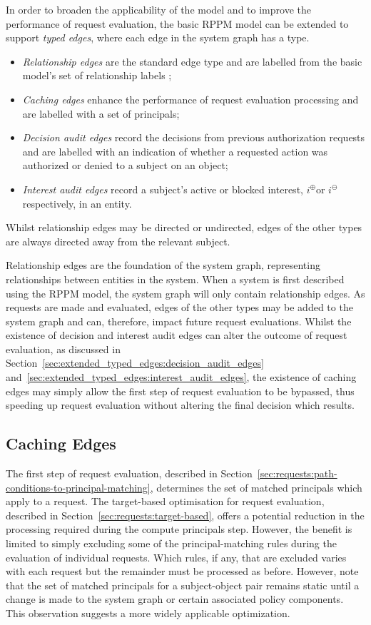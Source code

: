 \documentclass{article}
\newcommand{\interesta}{\ensuremath{i^\oplus}}
\newcommand{\interestb}{\ensuremath{i^\ominus}}
\begin{document}
In order to broaden the applicability of the model and to improve the performance of request evaluation, the basic RPPM model can be extended to support \emph{typed edges}, where each edge in the system graph has a type.
\begin{itemize}
    \item \emph{Relationship edges} are the standard edge type and are labelled from the basic model's set of relationship labels ;
    \item \emph{Caching edges} enhance the performance of request evaluation processing and are labelled with a set of principals;
    \item \emph{Decision audit edges} record the decisions from previous authorization requests and are labelled with an indication of whether a requested action  was authorized  or denied  to a subject on an object;
    \item \emph{Interest audit edges} record a subject's active or blocked interest, \interesta  or \interestb respectively, in an entity.
\end{itemize}
Whilst relationship edges may be directed or undirected,  edges of the other types are always directed away from the relevant subject.

Relationship edges are the foundation of the system graph, representing relationships between entities in the system.
When a system is first described using the RPPM model, the system graph will only contain relationship edges.
As requests are made and evaluated, edges of the other types may be added to the system graph and can, therefore, impact future request evaluations.
Whilst the existence of decision and interest audit edges can alter the outcome of request evaluation, as discussed in Section~\ref{sec:extended_typed_edges:decision_audit_edges} and~\ref{sec:extended_typed_edges:interest_audit_edges}, the existence of caching edges may simply allow the first step of request evaluation to be bypassed, thus speeding up request evaluation without altering the final decision which results.

\subsection{Caching Edges}\label{sec:extended_typed_edges:caching_edges}
The first step of request evaluation, described in Section~\ref{sec:requests:path-conditions-to-principal-matching}, determines the set of matched principals which apply to a request.
The target-based optimisation for request evaluation, described in Section~\ref{sec:requests:target-based}, offers a potential reduction in the processing required during the compute principals step.
However, the benefit is limited to simply excluding some of the principal-matching rules during the evaluation of individual requests.
Which rules, if any, that are excluded varies with each request but the remainder must be processed as before.
However, note that the set of matched principals for a subject-object pair remains static until a change is made to the system graph or certain associated policy components.
This observation suggests a more widely applicable optimization.
\end{document}
